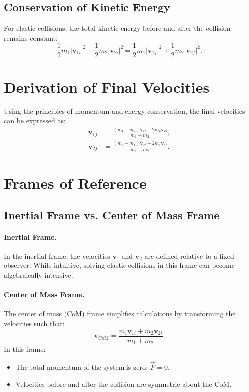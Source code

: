 \documentclass[12pt]{article}
\begin{document}
\subsection{Conservation of Kinetic Energy}
For elastic collisions, the total kinetic energy before and after the collision remains constant:
\begin{equation}
    \frac{1}{2} m_1 |\mathbf{v}_{1i}|^2 + \frac{1}{2} m_2 |\mathbf{v}_{2i}|^2 = \frac{1}{2} m_1 |\mathbf{v}_{1f}|^2 + \frac{1}{2} m_2 |\mathbf{v}_{2f}|^2.
\end{equation}

\section{Derivation of Final Velocities}
Using the principles of momentum and energy conservation, the final velocities can be expressed as:
\begin{align}
    \mathbf{v}_{1f} &= \frac{(m_1 - m_2) \mathbf{v}_{1i} + 2 m_2 \mathbf{v}_{2i}}{m_1 + m_2}, \\
    \mathbf{v}_{2f} &= \frac{(m_2 - m_1) \mathbf{v}_{2i} + 2 m_1 \mathbf{v}_{1i}}{m_1 + m_2}.
\end{align}

\section{Frames of Reference}

\subsection{Inertial Frame vs. Center of Mass Frame}

\paragraph{Inertial Frame.} In the inertial frame, the velocities $\mathbf{v}_{1}$ and $\mathbf{v}_{2}$ are defined relative to a fixed observer. While intuitive, solving elastic collisions in this frame can become algebraically intensive.

\paragraph{Center of Mass Frame.} The center of mass (CoM) frame simplifies calculations by transforming the velocities such that:
\begin{equation}
    \mathbf{v}_{\text{CoM}} = \frac{m_1 \mathbf{v}_{1i} + m_2 \mathbf{v}_{2i}}{m_1 + m_2}.
\end{equation}
In this frame:
\begin{itemize}
    \item The total momentum of the system is zero: $\vec{P} = 0$.
    \item Velocities before and after the collision are symmetric about the CoM.
\end{itemize}
\end{document}
